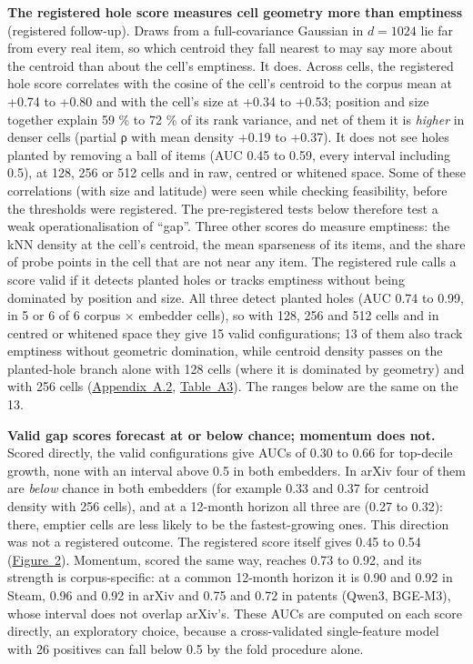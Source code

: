 \documentclass[
  10pt,
]{article}
\begin{document}
\textbf{The registered hole score
measures cell geometry more than
emptiness} (registered follow-up). Draws
from a full-covariance Gaussian in
\(d = 1024\) lie far from every real
item, so which centroid they fall
nearest to may say more about the
centroid than about the cell's
emptiness. It does. Across cells, the
registered hole score correlates with
the cosine of the cell's centroid to the
corpus mean at +0.74 to +0.80 and with
the cell's size at +0.34 to +0.53;
position and size together explain 59 \%
to 72 \% of its rank variance, and net
of them it is \emph{higher} in denser
cells (partial ρ with mean density +0.19
to +0.37). It does not see holes planted
by removing a ball of items (AUC 0.45 to
0.59, every interval including 0.5), at
128, 256 or 512 cells and in raw,
centred or whitened space. Some of these
correlations (with size and latitude)
were seen while checking feasibility,
before the thresholds were registered.
The pre-registered tests below therefore
test a weak operationalisation of
``gap''. Three other scores do measure
emptiness: the kNN density at the cell's
centroid, the mean sparseness of its
items, and the share of probe points in
the cell that are not near any item. The
registered rule calls a score valid if
it detects planted holes or tracks
emptiness without being dominated by
position and size. All three detect
planted holes (AUC 0.74 to 0.99, in 5 or
6 of 6 corpus × embedder cells), so with
128, 256 and 512 cells and in centred or
whitened space they give 15 valid
configurations; 13 of them also track
emptiness without geometric domination,
while centroid density passes on the
planted-hole branch alone with 128 cells
(where it is dominated by geometry) and
with 256 cells
(\hyperref[app:A.2]{Appendix~A.2},
\hyperref[tab:A3]{Table~A3}). The ranges
below are the same on the 13.

\textbf{Valid gap scores forecast at or
below chance; momentum does not.} Scored
directly, the valid configurations give
AUCs of 0.30 to 0.66 for top-decile
growth, none with an interval above 0.5
in both embedders. In arXiv four of them
are \emph{below} chance in both
embedders (for example 0.33 and 0.37 for
centroid density with 256 cells), and at
a 12-month horizon all three are (0.27
to 0.32): there, emptier cells are less
likely to be the fastest-growing ones.
This direction was not a registered
outcome. The registered score itself
gives 0.45 to 0.54
(\hyperref[fig:2]{Figure~2}). Momentum,
scored the same way, reaches 0.73 to
0.92, and its strength is
corpus-specific: at a common 12-month
horizon it is 0.90 and 0.92 in Steam,
0.96 and 0.92 in arXiv and 0.75 and 0.72
in patents (Qwen3, BGE-M3), whose
interval does not overlap arXiv's. These
AUCs are computed on each score
directly, an exploratory choice, because
a cross-validated single-feature model
with 26 positives can fall below 0.5 by
the fold procedure alone.
\end{document}
